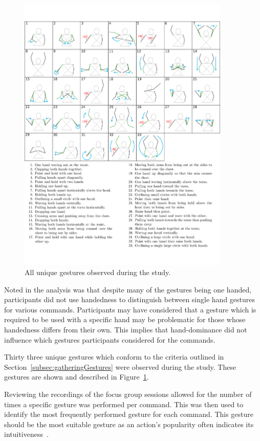 \documentclass[link]{IWCOMP}
\begin{document}
\begin{figure}[p]
   \centering
   \includegraphics[width=0.9\textwidth]{figures/all_gestures.png}
   \caption{All unique gestures observed during the study.}
   \label{fig:allGestures}
\end{figure}

Noted in the analysis was that despite many of the gestures being one handed, participants did not use handedness to distinguish between single hand gestures for various commands.
Participants may have considered that a gesture which is required to be used with a specific hand may be problematic for those whose handedness differs from their own.
This implies that hand-dominance did not influence which gestures participants considered for the commands.

Thirty three unique gestures which conform to the criteria outlined in Section~\ref{subsec:gatheringGestures} were observed during the study.
These gestures are shown and described in Figure~\ref{fig:allGestures}.  

Reviewing the recordings of the focus group sessions allowed for the number of times a specific gesture was performed per command.
This was then used to identify the most frequently performed gesture for each command.
This gesture should be the most suitable gesture as an action's popularity often indicates its intuitiveness~\citep{Grandhi2011}. \\
\end{document}
